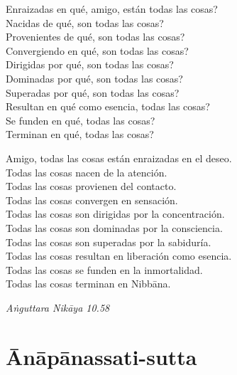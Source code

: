 \begin{english}
  Enraizadas en qué, amigo, están todas las cosas?\\
  Nacidas de qué, son todas las cosas?\\
  Provenientes de qué, son todas las cosas?\\
  Convergiendo en qué, son todas las cosas?\\
  Dirigidas por qué, son todas las cosas?\\
  Dominadas por qué, son todas las cosas?\\
  Superadas por qué, son todas las cosas?\\
  Resultan en qué como esencia, todas las cosas?\\
  Se funden en qué, todas las cosas?\\
  Terminan en qué, todas las cosas?

  \bigskip

  Amigo, todas las cosas están enraizadas en el deseo.\\
  Todas las cosas nacen de la atención.\\
  Todas las cosas provienen del contacto.\\
  Todas las cosas convergen en sensación.\\
  Todas las cosas son dirigidas por la concentración.\\
  Todas las cosas son dominadas por la consciencia.\\
  Todas las cosas son superadas por la sabiduría.\\
  Todas las cosas resultan en liberación como esencia.\\
  Todas las cosas se funden en la inmortalidad.\\
  Todas las cosas terminan en Nibbāna.

\end{english}

{\raggedleft
  \emph{Aṅguttara Nikāya 10.58}
\par}

\chapter{Ānāpānassati-sutta}


\begin{leader}
\end{leader}


